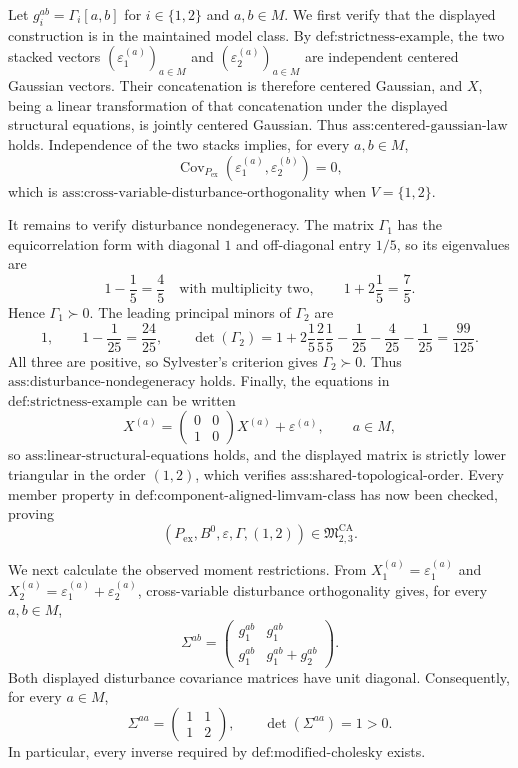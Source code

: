 Let \(g_i^{ab}=\Gamma_i[a,b]\) for \(i\in\{1,2\}\) and \(a,b\in M\).  We first verify that the displayed construction is in the maintained model class.  By \(\text{def:strictness-example}\), the two stacked vectors \((\varepsilon_1^{(a)})_{a\in M}\) and \((\varepsilon_2^{(a)})_{a\in M}\) are independent centered Gaussian vectors.  Their concatenation is therefore centered Gaussian, and \(X\), being a linear transformation of that concatenation under the displayed structural equations, is jointly centered Gaussian.  Thus \(\text{ass:centered-gaussian-law}\) holds.  Independence of the two stacks implies, for every \(a,b\in M\),
\[
\operatorname{Cov}_{P_{\mathrm{ex}}}(\varepsilon_1^{(a)},\varepsilon_2^{(b)})=0,
\]
which is \(\text{ass:cross-variable-disturbance-orthogonality}\) when \(V=\{1,2\}\).

It remains to verify disturbance nondegeneracy.  The matrix \(\Gamma_1\) has the equicorrelation form with diagonal \(1\) and off-diagonal entry \(1/5\), so its eigenvalues are
\[
1-\frac15=\frac45\quad\text{with multiplicity two},
\qquad
1+2\frac15=\frac75.
\]
Hence \(\Gamma_1\succ0\).  The leading principal minors of \(\Gamma_2\) are
\[
1,
\qquad
1-\frac1{25}=\frac{24}{25},
\qquad
\det(\Gamma_2)
=1+2\frac15\frac25\frac15-\frac1{25}-\frac4{25}-\frac1{25}
=\frac{99}{125}.
\]
All three are positive, so Sylvester's criterion gives \(\Gamma_2\succ0\).  Thus \(\text{ass:disturbance-nondegeneracy}\) holds.  Finally, the equations in \(\text{def:strictness-example}\) can be written
\[
X^{(a)}=
\begin{pmatrix}0&0\\1&0\end{pmatrix}X^{(a)}+\varepsilon^{(a)},
\qquad a\in M,
\]
so \(\text{ass:linear-structural-equations}\) holds, and the displayed matrix is strictly lower triangular in the order \((1,2)\), which verifies \(\text{ass:shared-topological-order}\).  Every member property in \(\text{def:component-aligned-limvam-class}\) has now been checked, proving
\[
(P_{\mathrm{ex}},B^0,\varepsilon,\Gamma,(1,2))\in\mathfrak M_{2,3}^{\mathrm{CA}}.
\]

We next calculate the observed moment restrictions.  From
\(X_1^{(a)}=\varepsilon_1^{(a)}\) and
\(X_2^{(a)}=\varepsilon_1^{(a)}+\varepsilon_2^{(a)}\), cross-variable disturbance orthogonality gives, for every \(a,b\in M\),
\[
\Sigma^{ab}
=\begin{pmatrix}
g_1^{ab}&g_1^{ab}\\
g_1^{ab}&g_1^{ab}+g_2^{ab}
\end{pmatrix}.
\]
Both displayed disturbance covariance matrices have unit diagonal.  Consequently, for every \(a\in M\),
\[
\Sigma^{aa}=\begin{pmatrix}1&1\\1&2\end{pmatrix},
\qquad \det(\Sigma^{aa})=1>0.
\]
In particular, every inverse required by \(\text{def:modified-cholesky}\) exists.


